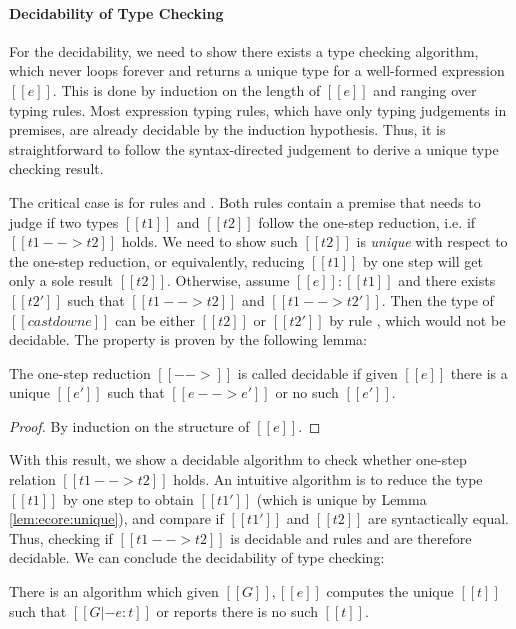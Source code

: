 \paragraph{Decidability of Type Checking}
For the decidability, we need to show there exists a type checking algorithm,
which never loops forever and returns a unique type for a well-formed
expression $[[e]]$. This is done by induction on the length of $[[e]]$ and
ranging over typing rules. Most expression typing rules, which have only typing
judgements in premises, are already decidable by the induction hypothesis. Thus, it
is straightforward to follow the syntax-directed judgement to derive a unique
type checking result.

The critical case is for rules  and .
Both rules contain a premise that needs to judge if two types $[[t1]]$ and
$[[t2]]$ follow the one-step reduction, i.e. if $[[t1 --> t2]]$ holds. We need
to show such $[[t2]]$ is \emph{unique} with respect to the one-step reduction,
or equivalently, reducing $[[t1]]$ by one step will get only a sole result
$[[t2]]$. Otherwise, assume $[[e]]:[[t1]]$ and there exists $[[t2']]$ such that
$[[t1 --> t2]]$ and $[[t1 --> t2']]$. Then the type of $[[castdown e]]$ can be
either $[[t2]]$ or $[[t2']]$ by rule , which
would not be
decidable. The property is proven by the following lemma:

\begin{lem}\label{lem:ecore:unique}
	The one-step reduction $[[-->]]$ is called decidable if 
given $[[e]]$ there is a unique $[[e']]$ such that $[[e --> e']]$ or no such $[[e']]$.
\end{lem}

\begin{proof}
	By induction on the structure of $[[e]]$.
\end{proof}

With this result, we show a decidable algorithm to check whether one-step
relation $[[t1 --> t2]]$ holds. An intuitive algorithm is to reduce the type
$[[t1]]$ by one step to obtain $[[t1']]$ (which is unique by Lemma
\ref{lem:ecore:unique}), and compare if $[[t1']]$ and $[[t2]]$ are
syntactically equal. Thus, checking if $[[t1 --> t2]]$ is decidable and rules
 and  are therefore decidable. We can
conclude the decidability of type checking:

\begin{thm}\label{lem:ecore:decide}
	There is an algorithm which given $[[G]], [[e]]$ computes the unique
$[[t]]$ such that $[[G |- e:t]]$ or reports there is no such $[[t]]$.
\end{thm}

